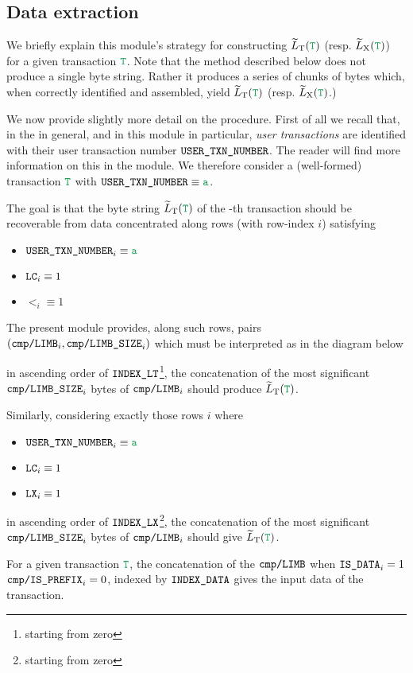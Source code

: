\subsection{Data extraction}

We briefly explain this module's strategy for constructing $\locLtTildeOfT$ (resp. $\locLxTildeOfT$) for a given transaction $\locTransaction$.
Note that the method described below does not produce a single byte string.
Rather it produces a series of chunks of bytes which, when correctly identified and assembled, yield $\locLtTildeOfT$ (resp. $\locLxTildeOfT$.)

We now provide slightly more detail on the procedure.
First of all we recall that, in the \zkEvm{} in general, and in this module in particular,
\emph{user transactions} are identified with their user transaction number
$\texttt{USER}\texttt{\_}\texttt{TXN\_NUMBER}$.
The reader will find more information on this in the \userTxnDataMod{} module.
We therefore consider a (well-formed) transaction $\locTransaction$ with $\userTransactionNumber \equiv \loc{a}$.

The goal is that the byte string $\locLtTildeOfT$
of the -th transaction
should be recoverable from data concentrated along rows
(with row-index $i$) satisfying
\begin{multicols}{3}
	\begin{itemize}
		\item $\userTransactionNumber _{i} \equiv \loc{a}$
		\item $\texttt{LC}                    _{i} \equiv 1$
		\item $\lt                    _{i} \equiv 1$
	\end{itemize}
\end{multicols}
The present module provides, along such rows,
pairs
$(\texttt{cmp}\texttt{/}\texttt{{\texttt{LIMB}}} _{i},
\texttt{cmp}\texttt{/}\texttt{{LIMB\_SIZE}} _{i})$
which must be interpreted as in the diagram below



in ascending order of $\texttt{INDEX\_LT}$\footnote{starting from zero},
the concatenation of the most significant 
$\texttt{cmp}\texttt{/}\texttt{{LIMB\_SIZE}} _{i}$ bytes of $\texttt{cmp}\texttt{/}\texttt{{\texttt{LIMB}}} _{i}$ should produce $\locLtTildeOfT$.

Similarly, considering exactly those rows $i$ where
\begin{multicols}{3}
	\begin{itemize}
		\item $\userTransactionNumber _{i} \equiv \loc{a}$
		\item $\texttt{LC}                    _{i} \equiv 1$
		\item $\texttt{LX}                    _{i} \equiv 1$
	\end{itemize}
\end{multicols}
\noindent in ascending order of $\texttt{INDEX\_LX}$\footnote{starting from zero},
the concatenation of the most significant 
$\texttt{cmp}\texttt{/}\texttt{{LIMB\_SIZE}} _{i}$ bytes of $\texttt{cmp}\texttt{/}\texttt{{\texttt{LIMB}}} _{i}$ should give $\locLtTildeOfT$.

\saNote{} For a given transaction $\locTransaction$,
the concatenation of the
$\texttt{cmp}\texttt{/}\texttt{{\texttt{LIMB}}}$ when
$\texttt{IS\_DATA} _{i} = 1$ \et{}
$\texttt{cmp}\texttt{/}\texttt{{\texttt{IS\_PREFIX}}} _{i} = 0$, indexed by
$\texttt{INDEX\_DATA}$ gives the input data of the transaction.
